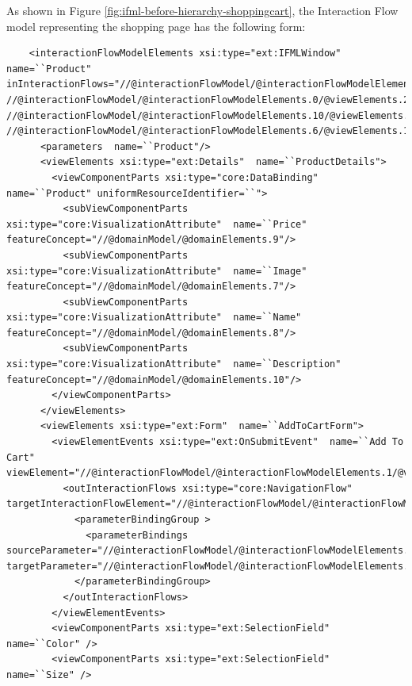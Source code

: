 As shown in Figure \ref{fig:ifml-before-hierarchy-shoppingcart}, the Interaction Flow model representing the shopping page has the following form:
\vspace{0.5cm}
\lstset{language=XML}
\begin{lstlisting} 
    <interactionFlowModelElements xsi:type="ext:IFMLWindow"  name=``Product" inInteractionFlows="//@interactionFlowModel/@interactionFlowModelElements.1/@viewElements.2/@viewElementEvents.0/@outInteractionFlows.0 //@interactionFlowModel/@interactionFlowModelElements.0/@viewElements.2/@viewElementEvents.0/@outInteractionFlows.0 //@interactionFlowModel/@interactionFlowModelElements.10/@viewElements.0/@viewElementEvents.0/@outInteractionFlows.0 //@interactionFlowModel/@interactionFlowModelElements.6/@viewElements.1/@viewElements.0/@viewElementEvents.0/@outInteractionFlows.0">
      <parameters  name=``Product"/>
      <viewElements xsi:type="ext:Details"  name=``ProductDetails">
        <viewComponentParts xsi:type="core:DataBinding"  name=``Product" uniformResourceIdentifier=``">
          <subViewComponentParts xsi:type="core:VisualizationAttribute"  name=``Price" featureConcept="//@domainModel/@domainElements.9"/>
          <subViewComponentParts xsi:type="core:VisualizationAttribute"  name=``Image" featureConcept="//@domainModel/@domainElements.7"/>
          <subViewComponentParts xsi:type="core:VisualizationAttribute"  name=``Name" featureConcept="//@domainModel/@domainElements.8"/>
          <subViewComponentParts xsi:type="core:VisualizationAttribute"  name=``Description" featureConcept="//@domainModel/@domainElements.10"/>
        </viewComponentParts>
      </viewElements>
      <viewElements xsi:type="ext:Form"  name=``AddToCartForm">
        <viewElementEvents xsi:type="ext:OnSubmitEvent"  name=``Add To Cart" viewElement="//@interactionFlowModel/@interactionFlowModelElements.1/@viewElements.1">
          <outInteractionFlows xsi:type="core:NavigationFlow"  targetInteractionFlowElement="//@interactionFlowModel/@interactionFlowModelElements.9">
            <parameterBindingGroup >
              <parameterBindings  sourceParameter="//@interactionFlowModel/@interactionFlowModelElements.1/@viewElements.1/@viewComponentParts.2" targetParameter="//@interactionFlowModel/@interactionFlowModelElements.1/@viewElements.1/@viewComponentParts.2"/>
            </parameterBindingGroup>
          </outInteractionFlows>
        </viewElementEvents>
        <viewComponentParts xsi:type="ext:SelectionField"  name=``Color" />
        <viewComponentParts xsi:type="ext:SelectionField"  name=``Size" />

\end{lstlisting}
